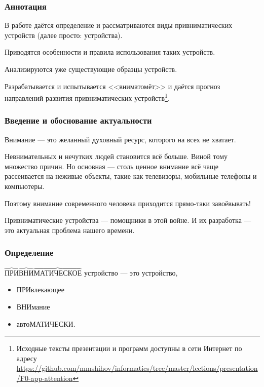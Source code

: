\begin{frame}
    \frametitle{Аннотация}
    
    В работе даётся определение и рассматриваются виды \alert{привниматических устройств} (далее просто: \alert{устройства}).
    
    \par\bigskip
    
    Приводятся \alert{особенности и правила} использования таких устройств. 
    
    \par\bigskip

    Анализируются уже \alert{существующие образцы} устройств.

    \par\bigskip
    
    Разрабатывается и испытывается <<вниматомёт>> \alert{\myDevice} и даётся прогноз направлений развития привниматических устройств\footnote{Исходные тексты презентации и программ доступны в сети Интернет по адресу \url{https://github.com/mmshihov/informatics/tree/master/lections/presentation/F0-app-attention}}.
\end{frame}

\begin{frame}
    \frametitle{Введение и обоснование актуальности}
    
    \alert{Внимание} --- это желанный духовный ресурс, которого на всех не хватает. 

    \par\bigskip
    Невнимательных и нечутких людей становится всё больше. Виной тому множество причин. Но основная --- столь ценное внимание всё чаще рассеивается на \alert{неживые} объекты, такие как телевизоры, мобильные телефоны и компьютеры.

    \par\bigskip

    Поэтому внимание современного человека приходится прямо-таки \alert{завоёвывать}!

    \par\bigskip

    Привниматические устройства --- помощники в этой войне. И их разработка --- это актуальная проблема нашего времени.
\end{frame}

\begin{frame}
    \frametitle{Определение}
    
    \begin{block}{}
        \par\bigskip
        \alert{$\overbrace{\text{ПРИ}}\overbrace{\text{ВНИ}}\overbrace{\text{МАТИЧЕСКОЕ}}$} устройство --- это устройство, 
        \begin{itemize}
            \item \alert{ПРИ}влекающее 
            \item \alert{ВНИ}мание 
            \item авто\alert{МАТИЧЕСКИ}.
        \end{itemize}
    \end{block}
\end{frame}
    
